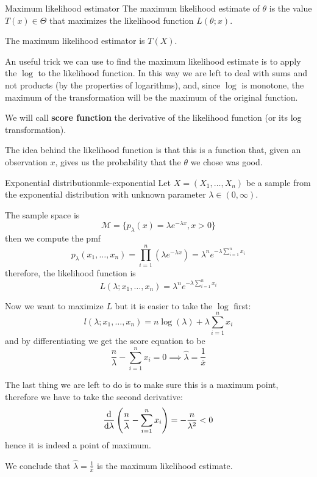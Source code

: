 \documentclass[12pt]{extarticle}
\begin{document}
\begin{definition}{Maximum likelihood estimator}{}
    The maximum likelihood estimate of $\theta$ is the value $T(x) \in \Theta$ that maximizes the likelihood function $L(\theta; x)$.

    The maximum likelihood estimator is $T(X)$.
\end{definition}

An useful trick we can use to find the maximum likelihood estimate is to apply the $\log$ to the likelihood function.
In this way we are left to deal with sums and not products (by the properties of logarithms), and, since $\log$ is monotone, the maximum of the transformation will be the maximum of the original function.

We will call \textbf{score function} the derivative of the likelihood function (or its log transformation).

The idea behind the likelihood function is that this is a function that, given an observation $x$, gives us the probability that the $\theta$ we chose was good.

\begin{example}{Exponential distribution}{mle-exponential}
    Let $X = (X_1, \dots, X_n)$ be a sample from the exponential distribution with unknown parameter $\lambda \in (0, \infty)$.

    The sample space is
    \begin{equation}
        \mathcal{M} = \{ p_\lambda(x) = \lambda e^{-\lambda x}, x > 0 \}
    \end{equation}
    then we compute the pmf
    \begin{equation}
        p_\lambda (x_1, \dots, x_n) = \prod_{i = 1}^n (\lambda e^{-\lambda x}) = \lambda^n e^{-\lambda \sum_{i = 1}^n x_i}
    \end{equation}
    therefore, the likelihood function is
    \begin{equation}
        L(\lambda; x_1, \dots, x_n) = \lambda^n e^{-\lambda \sum_{i = 1}^n x_i}
    \end{equation}

    Now we want to maximize $L$ but it is easier to take the $\log$ first:
    \begin{equation}
        l(\lambda; x_1, \dots, x_n) = n\log(\lambda) + \lambda \sum_{i = 1}^n x_i
    \end{equation}
    and by differentiating we get the score equation to be
    \begin{equation}
        \frac{n}{\lambda} - \sum_{i = 1}^{n} x_i = 0
        \implies \hat \lambda = \frac{1}{\bar{x}}
    \end{equation}

    The last thing we are left to do is to make sure this is a maximum point, therefore we have to take the second derivative:
    \begin{equation}
        \dv{}{\lambda} \left( \frac{n}{\lambda} - \sum_{i = 1}^{n} x_i \right) = -\frac{n}{\lambda^2} < 0
    \end{equation}
    hence it is indeed a point of maximum.

    We conclude that $\hat \lambda = \frac{1}{\bar{x}}$ is the maximum likelihood estimate.
\end{example}
\end{document}
